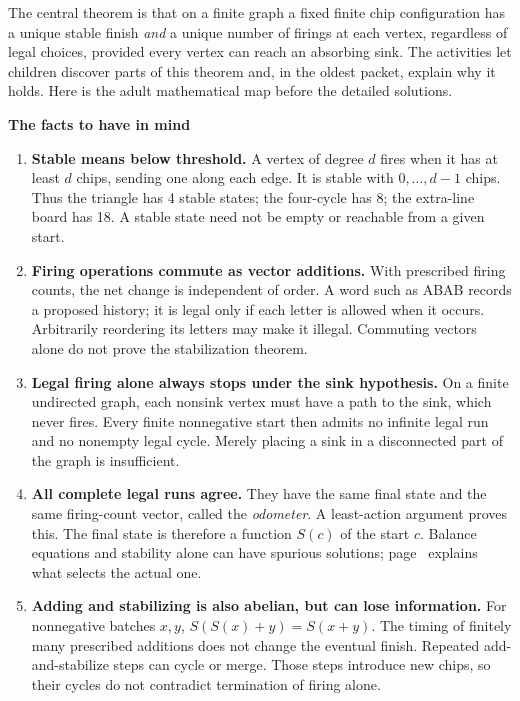 \label{overview}
The central theorem is that on a finite graph a fixed finite chip configuration has a unique stable finish \emph{and} a unique number of firings at each vertex, regardless of legal choices, provided every vertex can reach an absorbing sink. The activities let children discover parts of this theorem and, in the oldest packet, explain why it holds. Here is the adult mathematical map before the detailed solutions.

\textbf{The facts to have in mind}
\begin{enumerate}[leftmargin=18pt,itemsep=4pt,topsep=3pt]
\item \textbf{Stable means below threshold.} A vertex of degree $d$ fires when it has at least $d$ chips, sending one along each edge. It is stable with $0,\ldots,d-1$ chips. Thus the triangle has 4 stable states; the four-cycle has 8; the extra-line board has 18. A stable state need not be empty or reachable from a given start.
\item \textbf{Firing operations commute as vector additions.} With prescribed firing counts, the net change is independent of order. A word such as ABAB records a proposed history; it is legal only if each letter is allowed when it occurs. Arbitrarily reordering its letters may make it illegal. Commuting vectors alone do not prove the stabilization theorem.
\item \textbf{Legal firing alone always stops under the sink hypothesis.} On a finite undirected graph, each nonsink vertex must have a path to the sink, which never fires. Every finite nonnegative start then admits no infinite legal run and no nonempty legal cycle. Merely placing a sink in a disconnected part of the graph is insufficient.
\item \textbf{All complete legal runs agree.} They have the same final state and the same firing-count vector, called the \emph{odometer}. A least-action argument proves this. The final state is therefore a function $S(c)$ of the start $c$. Balance equations and stability alone can have spurious solutions; page~\pageref{determination} explains what selects the actual one.
\item \textbf{Adding and stabilizing is also abelian, but can lose information.} For nonnegative batches $x,y$, $S(S(x)+y)=S(x+y)$. The timing of finitely many prescribed additions does not change the eventual finish. Repeated add-and-stabilize steps can cycle or merge. Those steps introduce new chips, so their cycles do not contradict termination of firing alone.
\end{enumerate}


